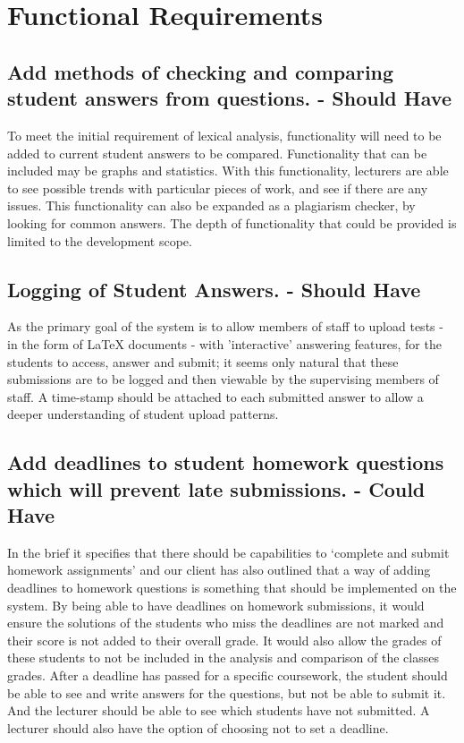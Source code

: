 \documentclass[12pt]{article}
\begin{document}
	\section{Functional Requirements}
	\subsection{Add methods of checking and comparing student answers from questions. - Should Have}
	To meet the initial requirement of lexical analysis, functionality will need to be added to current student answers to be compared. Functionality that can be included may be graphs and statistics. With this functionality, lecturers are able to see possible trends with particular pieces of work, and see if there are any issues. This functionality can also be expanded as a plagiarism checker, by looking for common answers. The depth of functionality that could be provided is limited to the development scope.
	\subsection{Logging of Student Answers. - Should Have}
	As the primary goal of the system is to allow members of staff to upload tests - in the form of LaTeX documents - with 'interactive' answering features, for the students to access, answer and submit; it seems only natural that these submissions are to be logged and then viewable by the supervising members of staff. A time-stamp should be attached to each submitted answer to allow a deeper understanding of student upload patterns.
	\subsection{Add deadlines to student homework questions which will prevent late submissions. - Could Have}
	In the brief it specifies that there should be capabilities to ‘complete and submit homework assignments’ and our client has also outlined that a way of adding deadlines to homework questions is something that should be implemented on the system.
By being able to have deadlines on homework submissions, it would ensure the solutions of the students who miss the deadlines are not marked and their score is not added to their overall grade. It would also allow the grades of these students to not be included in the analysis and comparison of the classes grades.
After a deadline has passed for a specific coursework, the student should be able to see and write answers for the questions, but not be able to submit it.  And the lecturer should be able to see which students have not submitted.
A lecturer should also have the option of choosing not to set a deadline.
\end{document}

